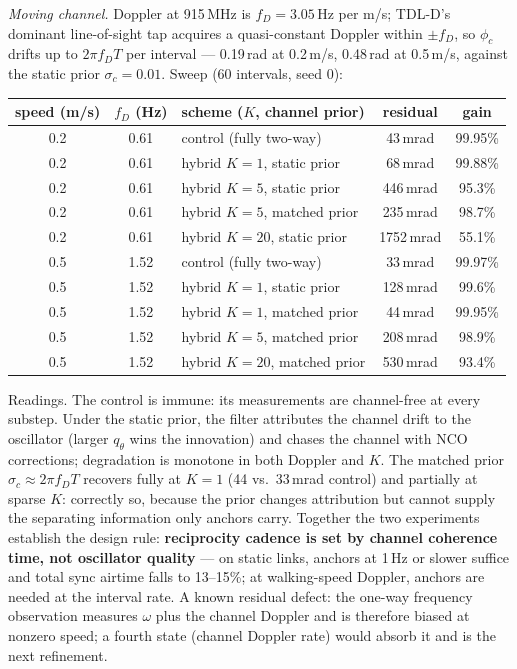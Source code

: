 \documentclass[10pt]{article}
\begin{document}
\emph{Moving channel.} Doppler at 915\,MHz is $f_D=3.05$\,Hz per m/s;
TDL-D's dominant line-of-sight tap acquires a quasi-constant Doppler
within $\pm f_D$, so $\phi_c$ drifts up to $2\pi f_D T$ per interval ---
0.19\,rad at 0.2\,m/s, 0.48\,rad at 0.5\,m/s, against the static prior
$\sigma_c=0.01$. Sweep (60 intervals, seed 0):
\begin{center}
\begin{tabular}{cclcc}
\toprule
speed (m/s) & $f_D$ (Hz) & scheme ($K$, channel prior) & residual & gain\\
\midrule
0.2 & 0.61 & control (fully two-way) & 43\,mrad & 99.95\%\\
0.2 & 0.61 & hybrid $K{=}1$, static prior & 68\,mrad & 99.88\%\\
0.2 & 0.61 & hybrid $K{=}5$, static prior & 446\,mrad & 95.3\%\\
0.2 & 0.61 & hybrid $K{=}5$, matched prior & 235\,mrad & 98.7\%\\
0.2 & 0.61 & hybrid $K{=}20$, static prior & 1752\,mrad & 55.1\%\\
0.5 & 1.52 & control (fully two-way) & 33\,mrad & 99.97\%\\
0.5 & 1.52 & hybrid $K{=}1$, static prior & 128\,mrad & 99.6\%\\
0.5 & 1.52 & hybrid $K{=}1$, matched prior & 44\,mrad & 99.95\%\\
0.5 & 1.52 & hybrid $K{=}5$, matched prior & 208\,mrad & 98.9\%\\
0.5 & 1.52 & hybrid $K{=}20$, matched prior & 530\,mrad & 93.4\%\\
\bottomrule
\end{tabular}
\end{center}
Readings. The control is immune: its measurements are channel-free at
every substep. Under the static prior, the filter attributes the channel
drift to the oscillator (larger $q_\theta$ wins the innovation) and
chases the channel with NCO corrections; degradation is monotone in both
Doppler and $K$. The matched prior $\sigma_c\approx2\pi f_DT$ recovers
fully at $K{=}1$ (44 vs.\ 33\,mrad control) and partially at sparse $K$:
correctly so, because the prior changes attribution but cannot supply
the separating information only anchors carry. Together the two
experiments establish the design rule: \textbf{reciprocity cadence is
set by channel coherence time, not oscillator quality} --- on static
links, anchors at 1\,Hz or slower suffice and total sync airtime falls
to 13--15\%; at walking-speed Doppler, anchors are needed at the
interval rate. A known residual defect: the one-way frequency
observation measures $\omega$ plus the channel Doppler and is therefore
biased at nonzero speed; a fourth state (channel Doppler rate) would
absorb it and is the next refinement.
\end{document}
